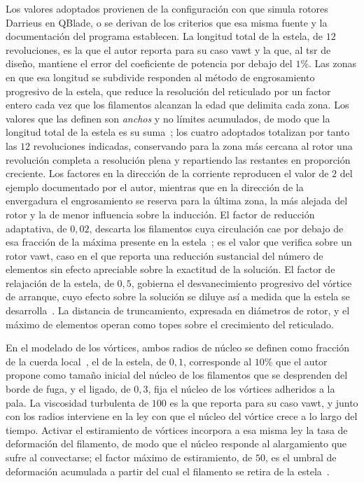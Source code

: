 Los valores adoptados provienen de la configuración con que \textcite{marten2019qblade} simula rotores Darrieus en QBlade, o se derivan de los criterios que esa misma fuente y la documentación del programa establecen. La longitud total de la estela, de $12$ revoluciones, es la que el autor reporta para su caso \gls{vawt} y la que, al \gls{tsr} de diseño, mantiene el error del coeficiente de potencia por debajo del $1\%$. Las zonas en que esa longitud se subdivide responden al método de engrosamiento progresivo de la estela, que reduce la resolución del reticulado por un factor entero cada vez que los filamentos alcanzan la edad que delimita cada zona. Los valores que las definen son \textit{anchos} y no límites acumulados, de modo que la longitud total de la estela es su suma~\parencite{QBladeDocsAero2024}; los cuatro adoptados totalizan por tanto las $12$ revoluciones indicadas, conservando para la zona más cercana al rotor una revolución completa a resolución plena y repartiendo las restantes en proporción creciente. Los factores en la dirección de la corriente reproducen el valor de $2$ del ejemplo documentado por el autor, mientras que en la dirección de la envergadura el engrosamiento se reserva para la última zona, la más alejada del rotor y la de menor influencia sobre la inducción. El factor de reducción adaptativa, de $0{,}02$, descarta los filamentos cuya circulación cae por debajo de esa fracción de la máxima presente en la estela~\parencite{QBladeDocsAero2024}; es el valor que \textcite{marten2019qblade} verifica sobre un rotor \gls{vawt}, caso en el que reporta una reducción sustancial del número de elementos sin efecto apreciable sobre la exactitud de la solución. El factor de relajación de la estela, de $0{,}5$, gobierna el desvanecimiento progresivo del vórtice de arranque, cuyo efecto sobre la solución se diluye así a medida que la estela se desarrolla~\parencite{QBladeDocsAero2024}. La distancia de truncamiento, expresada en diámetros de rotor, y el máximo de elementos operan como topes sobre el crecimiento del reticulado.

En el modelado de los vórtices, ambos radios de núcleo se definen como fracción de la cuerda local~\parencite{QBladeDocsAero2024}, el de la estela, de $0{,}1$, corresponde al $10\%$ que el autor propone como tamaño inicial del núcleo de los filamentos que se desprenden del borde de fuga, y el ligado, de $0{,}3$, fija el núcleo de los vórtices adheridos a la pala. La viscosidad turbulenta de $100$ es la que \textcite{marten2019qblade} reporta para su caso \gls{vawt}, y junto con los radios interviene en la ley con que el núcleo del vórtice crece a lo largo del tiempo. Activar el estiramiento de vórtices incorpora a esa misma ley la tasa de deformación del filamento, de modo que el núcleo responde al alargamiento que sufre al convectarse; el factor máximo de estiramiento, de $50$, es el umbral de deformación acumulada a partir del cual el filamento se retira de la estela~\parencite{QBladeDocsAero2024}.

